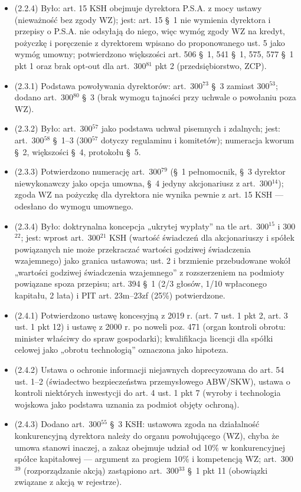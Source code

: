 \documentclass[12pt,a4paper]{report}
\begin{document}
\begin{itemize}
  \item (2.2.4) Było: art. 15 KSH obejmuje dyrektora P.S.A. z mocy ustawy (nieważność bez zgody WZ); jest: art. 15 §~1 nie wymienia dyrektora i przepisy o P.S.A. nie odsyłają do niego, więc wymóg zgody WZ na kredyt, pożyczkę i poręczenie z dyrektorem wpisano do proponowanego ust. 5 jako wymóg umowny; potwierdzono większości art. 506 §~1, 541 §~1, 575, 577 §~1 pkt 1 oraz brak opt-out dla art.~300$^{81}$ pkt 2 (przedsiębiorstwo, ZCP).
  \item (2.3.1) Podstawa powoływania dyrektorów: art.~300$^{73}$ §~3 zamiast 300$^{53}$; dodano art.~300$^{80}$ §~3 (brak wymogu tajności przy uchwale o powołaniu poza WZ).
  \item (2.3.2) Było: art.~300$^{57}$ jako podstawa uchwał pisemnych i zdalnych; jest: art.~300$^{58}$ §~1–3 (300$^{57}$ dotyczy regulaminu i komitetów); numeracja kworum §~2, większości §~4, protokołu §~5.
  \item (2.3.3) Potwierdzono numerację art.~300$^{79}$ (§~1 pełnomocnik, §~3 dyrektor niewykonawczy jako opcja umowna, §~4 jedyny akcjonariusz z art.~300$^{14}$); zgoda WZ na pożyczkę dla dyrektora nie wynika pewnie z art. 15 KSH — odesłano do wymogu umownego.
  \item (2.3.4) Było: doktrynalna koncepcja „ukrytej wypłaty” na tle art.~300$^{15}$ i 300$^{22}$; jest: wprost art.~300$^{21}$ KSH (wartość świadczeń dla akcjonariuszy i spółek powiązanych nie może przekraczać wartości godziwej świadczenia wzajemnego) jako granica ustawowa; ust. 2 i brzmienie przebudowane wokół „wartości godziwej świadczenia wzajemnego” z rozszerzeniem na podmioty powiązane spoza przepisu; art. 394 §~1 (2/3 głosów, 1/10 wpłaconego kapitału, 2 lata) i PIT art. 23m–23zf (25\%) potwierdzone.
  \item (2.4.1) Potwierdzono ustawę koncesyjną z 2019 r. (art. 7 ust. 1 pkt 2, art. 3 ust. 1 pkt 12) i ustawę z 2000 r. po noweli poz. 471 (organ kontroli obrotu: minister właściwy do spraw gospodarki); kwalifikacja licencji dla spółki celowej jako „obrotu technologią” oznaczona jako hipoteza.
  \item (2.4.2) Ustawa o ochronie informacji niejawnych doprecyzowana do art. 54 ust. 1–2 (świadectwo bezpieczeństwa przemysłowego ABW/SKW), ustawa o kontroli niektórych inwestycji do art. 4 ust. 1 pkt 7 (wyroby i technologia wojskowa jako podstawa uznania za podmiot objęty ochroną).
  \item (2.4.3) Dodano art.~300$^{55}$ §~3 KSH: ustawowa zgoda na działalność konkurencyjną dyrektora należy do organu powołującego (WZ), chyba że umowa stanowi inaczej, a zakaz obejmuje udział od 10\% w konkurencyjnej spółce kapitałowej — argument za progiem 10\% i kompetencją WZ; art.~300$^{39}$ (rozporządzanie akcją) zastąpiono art.~300$^{33}$ §~1 pkt 11 (obowiązki związane z akcją w rejestrze).

\end{itemize}
\end{document}
